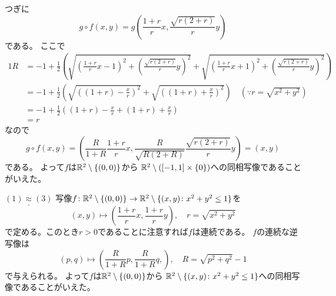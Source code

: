 \documentclass[report]{jlreq}
\begin{document}
\begin{answer}
    つぎに
    \begin{equation}
        g \circ f(x, y)
            = g\left(
                \frac{1 + r}{r} x,
                \frac{\sqrt{r (2 + r)}}{r} y
            \right)
    \end{equation}
    である。
    ここで
    \begin{alignat}{1}
        R
            &= -1 + \frac{1}{2}\left(
                \sqrt{\left(\frac{1 + r}{r} x - 1\right)^2
                    + \left(\frac{\sqrt{r (2 + r)}}{r} y\right)^2}
                +
                \sqrt{\left(\frac{1 + r}{r} x + 1\right)^2
                    + \left(\frac{\sqrt{r (2 + r)}}{r} y\right)^2}
            \right) \\
            &= -1 + \frac{1}{2}\left(
                \sqrt{\left( (1 + r) - \frac{x}{r} \right)^2}
                +
                \sqrt{\left( (1 + r) + \frac{x}{r} \right)^2}
            \right) \quad (\because r = \sqrt{x^2 + y^2}) \\
            &= -1 + \frac{1}{2}\left(
                (1 + r) - \frac{x}{r} + (1 + r) + \frac{x}{r}
            \right) \\
            &= r
    \end{alignat}
    なので
    \begin{equation}
        g \circ f(x, y)
            = \left(
                \frac{R}{1 + R} \frac{1 + r}{r} x,
                \frac{R}{\sqrt{R (2 + R)}} \frac{\sqrt{r (2 + r)}}{r} y
            \right)
            = (x, y)
    \end{equation}
    である。
    よって$f$は$\mathbb{R}^2 \setminus \{(0, 0)\}$から
    $\mathbb{R}^2 \setminus ([-1, 1] \times \{0\})$への同相写像であることがいえた。

    $\underline{(1) \approx (3)}$\quad
    写像$f \colon \mathbb{R}^2 \setminus \{(0, 0)\}
    \to \mathbb{R}^2 \setminus \{ (x, y) \colon x^2 + y^2 \le 1 \}$を
    \begin{equation}
        (x, y) \mapsto \left(
            \frac{1 + r}{r} x,
            \frac{1 + r}{r} y
        \right),
        \quad r = \sqrt{x^2 + y^2}
    \end{equation}
    で定める。このとき$r > 0$であることに注意すれば$f$は連続である。
    $f$の連続な逆写像は
    \begin{equation}
        (p, q) \mapsto \left(
            \frac{R}{1 + R} p,
            \frac{R}{1 + R} q,
        \right),
        \quad R = \sqrt{p^2 + q^2} - 1
    \end{equation}
    で与えられる。
    よって$f$は$\mathbb{R}^2 \setminus \{(0, 0)\}$から
    $\mathbb{R}^2 \setminus \{ (x, y) \colon x^2 + y^2 \le 1 \}$への同相写像であることがいえた。
\end{answer}
\end{document}
